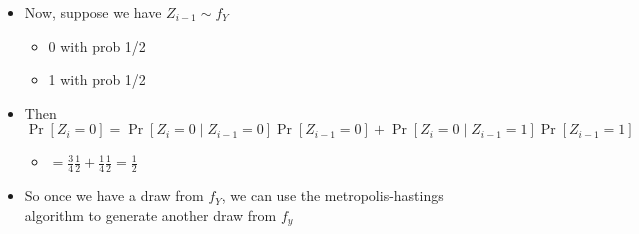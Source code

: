 \begin{itemize}
\begin{itemize}
\begin{itemize}
\end{itemize}
\end{itemize}
\item Now, suppose we have $Z_{i-1} ∼ f_Y$
\begin{itemize}
\item 0 with prob 1/2
\item 1 with prob 1/2
\end{itemize}
\item Then $\Pr[Z_i = 0] = \Pr[Z_i = 0 ∣ Z_{i-1}=0] \Pr[Z_{i-1} = 0] + \Pr[Z_i = 0 ∣ Z_{i-1}=1] \Pr[Z_{i-1} = 1]$
\begin{itemize}
\item $= \frac{3}{4} \frac{1}{2} + \frac{1}{4} \frac{1}{2} = \frac12$
\end{itemize}
\item So once we have a draw from $f_Y$, we can use the
        metropolis-hastings algorithm to generate another draw from $f_y$
\end{itemize}

